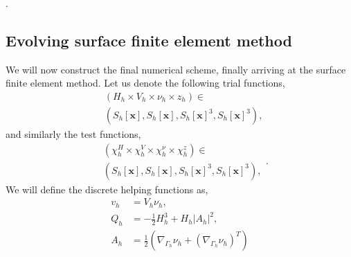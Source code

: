 .



\subsection{Evolving surface finite element method }%
\label{sub:surface_finite_element_method}




We will now construct the final numerical scheme, finally arriving at the surface finite element method.
Let us denote the following trial functions,
\begin{equation}
\label{eq:FE_trial}
    \begin{split}
& ( H_{h} \times V_{h} \times \nu_{h}  \times z_{h} ) \in \\
&\left( S_{h}\left[ \mathbf{x} \right],S_{h}\left[ \mathbf{x} \right], S_{h}\left[ \mathbf{x} \right] ^3,S_{h}\left[ \mathbf{x} \right] ^3    \right),
    \end{split}
\end{equation}
and similarly the test functions,
\begin{equation}
\label{eq:FE_test}
    \begin{split}
& ( \chi_{h}^{H}  \times \chi_{h} ^{V} \times \chi_{h} ^{\nu }  \times \chi_{h} ^{z} ) \in \\
&\left( S_{h}\left[ \mathbf{x} \right],S_{h}\left[ \mathbf{x} \right], S_{h}\left[ \mathbf{x} \right] ^3,S_{h}\left[ \mathbf{x} \right] ^3    \right),
    \end{split}
.\end{equation}
We will define the discrete helping functions as,
\[
    \begin{split}
v_{h} & = V_{h}\nu_{h}, \\
Q_{h} & =  - \frac{1}{2} H_{h}^{3} + H_{h} \left\lvert A_{h} \right\rvert^2, \\
A_{h} & = \frac{1}{2}\left( \nabla _{\Gamma_{h} } \nu_{h} + \left( \nabla _{\Gamma _{h}}\nu _{h} \right) ^{T} \right)
    \end{split}
\]

